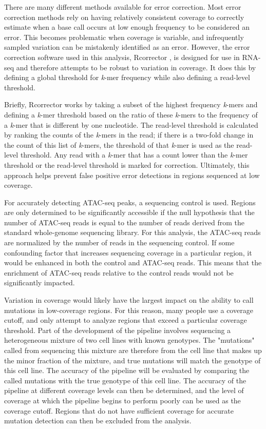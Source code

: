 There are many different methods available for error correction.
Most error correction methods rely on having relatively consistent coverage to correctly estimate when a base call occurs at low enough frequency to be considered an error. This becomes problematic when coverage is variable, and infrequently sampled variation can be mistakenly identified as an error. However, the error correction software used in this analysis, Rcorrector \parencite{song_rcorrector:_2015}, is designed for use in RNA-seq and therefore attempts to be robust to variation in coverage.
It does this by defining a global threshold for \textit{k}-mer frequency while also defining a read-level threshold.

Briefly, Rcorrector works by taking a subset of the highest frequency \textit{k}-mers and defining a \textit{k}-mer threshold based on the ratio of these \textit{k}-mers to the frequency of a \textit{k}-mer that is different by one nucleotide. The read-level threshold is calculated by ranking the counts of the \textit{k}-mers in the read; if there is a two-fold change in the count of this list of \textit{k}-mers, the threshold of that \textit{k}-mer is used as the read-level threshold. Any read with a \textit{k}-mer that has a count lower than the \textit{k}-mer threshold or the read-level threshold is marked for correction. Ultimately, this approach helps prevent false positive error detections in regions sequenced at low coverage.

For accurately detecting ATAC-seq peaks, a sequencing control is used.
Regions are only determined to be significantly accessible if the null hypothesis that the number of ATAC-seq reads is equal to the number of reads derived from the standard whole-genome sequencing library.
For this analysis, the ATAC-seq reads are normalized by the number of reads in the sequencing control.
If some confounding factor that increases sequencing coverage in a particular region, it would be enhanced in both the control and ATAC-seq reads. This means that the enrichment of ATAC-seq reads relative to the control reads would not be significantly impacted.

Variation in coverage would likely have the largest impact on the ability to call mutations in low-coverage regions. For this reason, many people use a coverage cutoff, and only attempt to analyze regions that exceed a particular coverage threshold. Part of the development of the pipeline involves sequencing a heterogeneous mixture of two cell lines with known genotypes. The "mutations" called from sequencing this mixture are therefore from the cell line that makes up the minor fraction of the mixture, and true mutations will match the genotype of this cell line. The accuracy of the pipeline will be evaluated by comparing the called mutations with the true genotype of this cell line. The accuracy of the pipeline at different coverage levels can then be determined, and the level of coverage at which the pipeline begins to perform poorly can be used as the coverage cutoff. Regions that do not have sufficient coverage for accurate mutation detection can then be excluded from the analysis.


